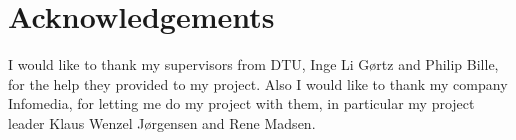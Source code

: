 \chapter{Acknowledgements}

I would like to thank my supervisors from DTU, Inge Li Gørtz and Philip Bille, for the help they provided to my project. Also I would like to thank my company Infomedia, for letting me do my project with them, in particular my project leader Klaus Wenzel Jørgensen and Rene Madsen.


